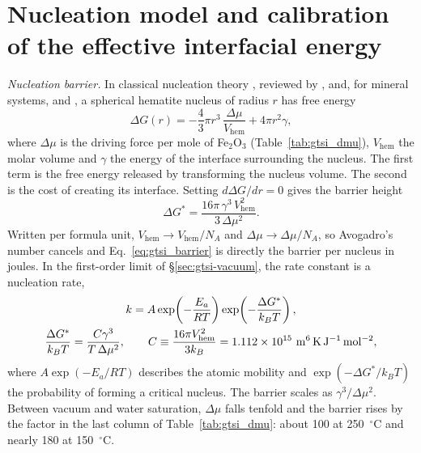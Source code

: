 \section{Nucleation model and calibration of the effective interfacial energy}\label{sec:gtsi-nucleation}

\textit{Nucleation barrier.} In classical nucleation theory \citep{gibbs1878,volmer1926,becker1935},
reviewed by \citet{christian2002}, \citet{kashchiev2000} and, for mineral systems,
\citet{deyoreo2003} and \citet{lasaga1998}, a spherical hematite nucleus of radius $r$ has free
energy
\begin{equation}
  \Delta G(r) = -\frac{4}{3}\pi r^{3}\,\frac{\Delta\mu}{V_{\mathrm{hem}}} + 4\pi r^{2}\gamma,
\end{equation}
where $\Delta\mu$ is the driving force per mole of Fe$_2$O$_3$ (Table~\ref{tab:gtsi_dmu}),
$V_{\mathrm{hem}}$ the molar volume and $\gamma$ the energy of the interface surrounding the
nucleus. The first term is the free energy released by transforming the nucleus volume. The second
is the cost of creating its interface. Setting $d\Delta G/dr=0$ gives the barrier height
\begin{equation}
  \Delta G^{*} = \frac{16\pi\,\gamma^{3}\,V_{\mathrm{hem}}^{2}}{3\,\Delta\mu^{2}} .
  \label{eq:gtsi_barrier}
\end{equation}
Written per formula unit, $V_{\mathrm{hem}}\to V_{\mathrm{hem}}/N_A$ and $\Delta\mu\to\Delta\mu/N_A$, so
Avogadro's number cancels and Eq.~\eqref{eq:gtsi_barrier} is directly the barrier per nucleus in
joules. In the first-order limit of \S\ref{sec:gtsi-vacuum}, the rate constant is a nucleation
rate,
\begin{gather}
  k = A\exp\!\left(-\frac{E_a}{RT}\right)\exp\!\left(-\frac{\Delta G^{*}}{k_B T}\right), \notag\\
  \frac{\Delta G^{*}}{k_B T} = \frac{C\gamma^{3}}{T\,\Delta\mu^{2}},
  \qquad
  C \equiv \frac{16\pi V_{\mathrm{hem}}^{2}}{3k_B} = 1.112\times10^{15}~\mathrm{m^6\,K\,J^{-1}\,mol^{-2}} ,
  \label{eq:gtsi_knuc}
\end{gather}
where $A\exp(-E_a/RT)$ describes the atomic mobility and $\exp(-\Delta G^{*}/k_BT)$ the probability of
forming a critical nucleus. The barrier scales as $\gamma^3/\Delta\mu^2$. Between vacuum and water
saturation, $\Delta\mu$ falls tenfold and the barrier rises by the factor in the last column of
Table~\ref{tab:gtsi_dmu}: about 100 at 250~$^\circ$C and nearly 180 at 150~$^\circ$C.

